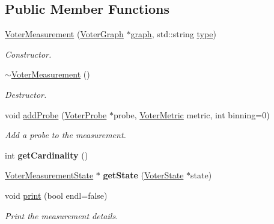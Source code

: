 \subsection*{Public Member Functions}
\begin{DoxyCompactItemize}
\item 
\hyperlink{class_voter_measurement_a0668249876e48af0ae246a554b30195c}{Voter\-Measurement} (\hyperlink{class_voter_graph}{Voter\-Graph} $\ast$\hyperlink{class_voter_measurement_a8d22d4b78f7e2f4c747f5716c4885351}{graph}, std\-::string \hyperlink{class_voter_measurement_ad4471a133827f052622a84c4a451aabe}{type})
\begin{DoxyCompactList}\small\item\em Constructor. \end{DoxyCompactList}\item 
\hypertarget{class_voter_measurement_a2cbd2d015fad1579c21dc62dd2511fe6}{\hyperlink{class_voter_measurement_a2cbd2d015fad1579c21dc62dd2511fe6}{$\sim$\-Voter\-Measurement} ()}\label{class_voter_measurement_a2cbd2d015fad1579c21dc62dd2511fe6}

\begin{DoxyCompactList}\small\item\em Destructor. \end{DoxyCompactList}\item 
void \hyperlink{class_voter_measurement_a4dc0ed5870875acb3a8651ca25ff2b74}{add\-Probe} (\hyperlink{class_voter_probe}{Voter\-Probe} $\ast$probe, \hyperlink{voter__graph_8hpp_acb4c45a5ce4a55eee28e54e60409b9c5}{Voter\-Metric} metric, int binning=0)
\begin{DoxyCompactList}\small\item\em Add a probe to the measurement. \end{DoxyCompactList}\item 
\hypertarget{class_voter_measurement_a43a426ee79a1e1a91cf1bf148309a746}{int {\bfseries get\-Cardinality} ()}\label{class_voter_measurement_a43a426ee79a1e1a91cf1bf148309a746}

\item 
\hypertarget{class_voter_measurement_a671dc85ea1e4912705905f8d5b3e1538}{\hyperlink{class_voter_measurement_state}{Voter\-Measurement\-State} $\ast$ {\bfseries get\-State} (\hyperlink{class_voter_state}{Voter\-State} $\ast$state)}\label{class_voter_measurement_a671dc85ea1e4912705905f8d5b3e1538}

\item 
void \hyperlink{class_voter_measurement_a9164cbbbf69d83a6ca5d8cda0951dcd5}{print} (bool endl=false)
\begin{DoxyCompactList}\small\item\em Print the measurement details. \end{DoxyCompactList}\end{DoxyCompactItemize}
